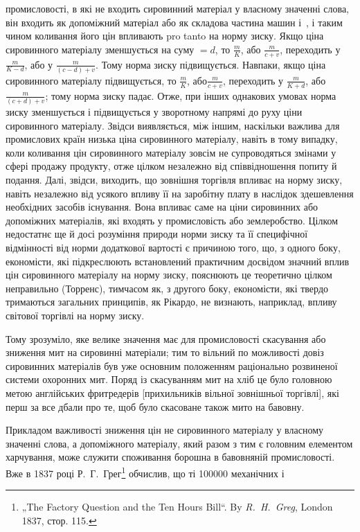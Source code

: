 \parcont{}  %
промисловості, в які не входить сировинний матеріал у власному значенні слова, він входить як
допоміжний матеріал або як складова частина машин і~, і таким чином коливання його цін
впливають pro tanto на норму зиску. Якщо ціна сировинного матеріалу зменшується на суму $= d$, то $\frac{m}{K}$,
або $\frac{m}{c + v}$, переходить у $\frac{m}{K - d}$, або у
$\frac{m}{(c - d) + v}$. Тому норма зиску підвищується. Навпаки, якщо ціна сировинного матеріалу
підвищується, то $\frac{m}{K}$, або$\frac{m}{c + v}$, переходить у $\frac{m}{K + d}$,
або $\frac{m}{(c + d) + v}$; тому норма зиску
падає. Отже, при інших однакових умовах норма
зиску зменшується і підвищується у зворотному напрямі до руху ціни сировинного матеріалу. Звідси
виявляється, між іншим, наскільки важлива для промислових країн низька ціна сировинного матеріалу,
навіть в тому випадку, коли коливання цін сировинного матеріалу зовсім не супроводяться змінами у
сфері продажу продукту, отже цілком незалежно від співвідношення попиту й подання. Далі, звідси,
виходить, що зовнішня торгівля впливає на норму зиску, навіть незалежно від усякого впливу її на
заробітну плату в наслідок здешевлення необхідних засобів існування. Вона впливає саме на ціни
сировинних або допоміжних матеріалів, які входять у промисловість або землеробство. Цілком
недостатнє ще й досі розуміння природи норми зиску та її специфічної відмінності від норми
додаткової вартості є причиною того, що, з одного боку, економісти, які підкреслюють встановлений
практичним досвідом значний вплив цін сировинного матеріалу на норму зиску, пояснюють це теоретично
цілком неправильно (Торренс), тимчасом як, з другого боку, економісти, які твердо тримаються
загальних принципів, як Рікардо, не визнають, наприклад, впливу світової торгівлі на норму зиску.

Тому зрозуміло, яке велике значення має для промисловості скасування або зниження мит на сировинні
матеріали; тим то вільний по можливості довіз сировинних матеріалів був уже основним положенням
раціонально розвиненої системи охоронних мит. Поряд із скасуванням мит на хліб це було головною
метою англійських фритредерів [прихильників вільної зовнішньої торгівлі], які перш за все дбали про
те, щоб було скасоване також мито на бавовну.

Прикладом важливості зниження цін не сировинного матеріалу у власному значенні слова, а допоміжного
матеріалу, який разом з тим є головним елементом харчування, може служити споживання борошна в
бавовняній промисловості. Вже в 1837 році Р.~Г.~Грег\footnote{
„The Factory Question and the Ten Hours Bill“. By \emph{R.~H.~Greg}, London 1837, стор. 115.
} обчислив, що ті \num{100000} механічних і
\parbreak{}  %
